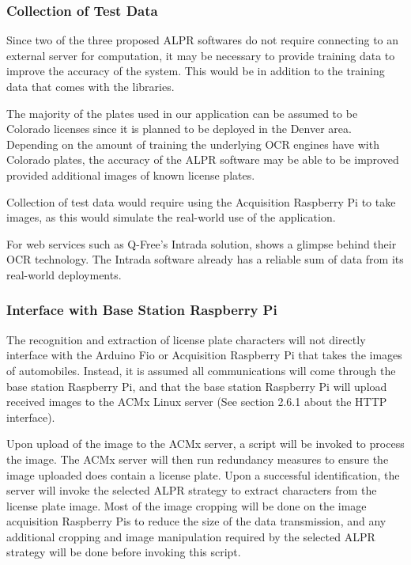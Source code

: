 \documentclass[11pt, oneside, fullpage, doublespace]{article}
\begin{document}
\subsubsection{Collection of Test Data}
Since two of the three proposed ALPR softwares do not require connecting to an external server for computation, it may be necessary to provide training data to improve the accuracy of the system. This would be in addition to the training data that comes with the libraries.

The majority of the plates used in our application can be assumed to be Colorado licenses since it is planned to be deployed in the Denver area. Depending on the amount of training the underlying OCR engines have with Colorado plates, the accuracy of the ALPR software may be able to be improved provided additional images of known license plates.

Collection of test data would require using the Acquisition Raspberry Pi to take images, as this would simulate the real-world use of the application.

For web services such as Q-Free's Intrada solution, \cite{intrada2014} shows a glimpse behind their OCR technology. The Intrada software already has a reliable sum of data from its real-world deployments.

\subsubsection{Interface with Base Station Raspberry Pi}
The recognition and extraction of license plate characters will not directly interface with the Arduino Fio or Acquisition Raspberry Pi that takes the images of automobiles. Instead, it is assumed all communications will come through the base station Raspberry Pi, and that the base station Raspberry Pi will upload received images to the ACMx Linux server (See section 2.6.1 about the HTTP interface).

Upon upload of the image to the ACMx server, a script will be invoked to process the image. The ACMx server will then run redundancy measures to ensure the image uploaded does contain a license plate. Upon a successful identification, the server will invoke the selected ALPR strategy to extract characters from the license plate image. Most of the image cropping will be done on the image acquisition Raspberry Pis to reduce the size of the data transmission, and any additional cropping and image manipulation required by the selected ALPR strategy will be done before invoking this script.
\end{document}

